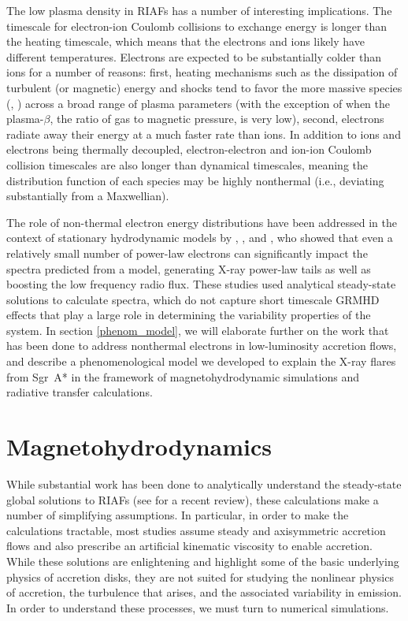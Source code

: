The low plasma density in RIAFs has a number of interesting implications.  The timescale for electron-ion Coulomb collisions to exchange energy is longer than the heating timescale, which means that the electrons and ions likely have different temperatures.  Electrons are expected to be substantially colder than ions for a number of reasons: first, heating mechanisms such as the dissipation of turbulent (or magnetic) energy and shocks tend to favor the more massive species (\citealt{howes2010}, \citealt{rowan2017}) across a broad range of plasma parameters (with the exception of when the plasma-$\beta$, the ratio of gas to magnetic pressure, is very low), second, electrons radiate away their energy at a much faster rate than ions.  In addition to ions and electrons being thermally decoupled, electron-electron and ion-ion Coulomb collision timescales are also  longer than dynamical timescales, meaning the distribution function of each species may be highly nonthermal (i.e., deviating substantially from a Maxwellian).

The role of non-thermal electron energy distributions have been addressed in the context of stationary hydrodynamic models by \citet{mahadevan1998}, \citet{ozel2000}, and \citet{yuan2003}, who showed that even a relatively small number of power-law electrons can significantly impact the spectra predicted from a model, generating X-ray power-law tails as well as boosting the low frequency radio flux.  These studies used analytical steady-state solutions to calculate spectra, which do not capture short timescale GRMHD effects that play a large role in determining the variability properties of the system.  In section \ref{phenom_model}, we will elaborate further on the work that has been done to address nonthermal electrons in low-luminosity accretion flows, and describe a phenomenological model we developed to explain the X-ray flares from Sgr~A* in the framework of magnetohydrodynamic simulations and radiative transfer calculations.

\label{sec_lowlum}
\section{Magnetohydrodynamics}
While substantial work has been done to analytically understand the steady-state global solutions to RIAFs (see \citealt{yuan2014} for a recent review), these calculations make a number of simplifying assumptions.  In particular, in order to make the calculations tractable, most studies assume steady and axisymmetric accretion flows and also prescribe an artificial kinematic viscosity to enable accretion.  While these solutions are enlightening and highlight some of the basic underlying physics of accretion disks, they are not suited for studying the nonlinear physics of accretion, the turbulence that arises, and the associated variability in emission.  In order to understand these processes, we must turn to numerical simulations.

